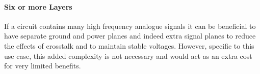 \paragraph{Six or more Layers}
If a circuit contains many high frequency analogue signals it can be beneficial to have separate ground and power planes and indeed extra signal planes to reduce the effects of crosstalk and to maintain stable voltages. However, specific to this use case, this added complexity is not necessary and would act as an extra cost for very limited benefits.


